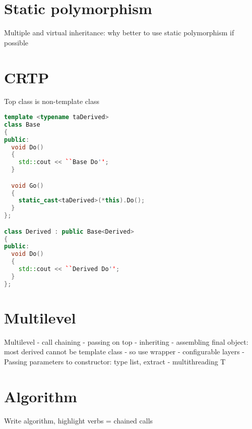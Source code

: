 \documentclass[a4paper]{article}
\begin{document}
\section{Static polymorphism}
Multiple and virtual inheritance: why better to use static polymorphism if possible


\section{CRTP}
 Top class is non-template class

\begin{lstlisting}[language=c++]
template <typename taDerived>
class Base
{
public:
  void Do() 
  {
    std::cout << ``Base Do'';
  }

  void Go()
  {
    static_cast<taDerived>(*this).Do();
  }
};

class Derived : public Base<Derived>
{
public:
  void Do() 
  {
    std::cout << ``Derived Do'';
  }
};
\end{lstlisting}

\section{Multilevel}
Multilevel
 - call chaining
 - passing on top
 - inheriting
 - assembling final object: most derived cannot be template class - so use wrapper
 - configurable layers
 - Passing parameters to constructor: type list, extract
 - multithreading T

\section{Algorithm}
Write algorithm, highlight verbs = chained calls
\end{document}
